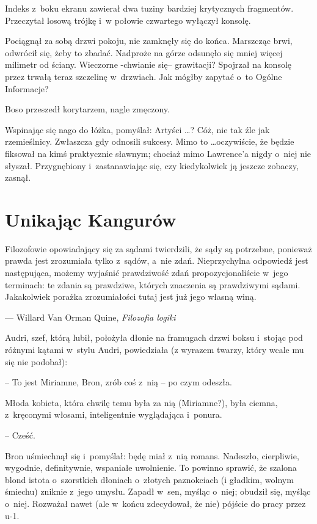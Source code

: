 \documentclass[oneside,polish,11pt,rmheadings]{mwbk}
\begin{document}
Indeks z~boku ekranu zawierał dwa tuziny bardziej krytycznych fragmentów. Przeczytał losową trójkę i~w połowie czwartego wyłączył konsolę. 

Pociągnął za sobą drzwi pokoju, nie zamknęły się do końca. Marszcząc brwi, odwrócił się, żeby to zbadać. Nadproże na górze odsunęło się mniej więcej milimetr od ściany. Wieczorne -chwianie się-- grawitacji? Spojrzał na konsolę przez trwałą teraz szczelinę w~drzwiach. Jak mógłby zapytać o~to Ogólne Informacje? 

Boso przeszedł korytarzem, nagle zmęczony. 

Wspinając się nago do łóżka, pomyślał: Artyści \ldots  ? Cóż, nie tak źle jak rzemieślnicy. Zwłaszcza gdy odnosili sukcesy. Mimo to \ldots  oczywiście, że będzie fiksował na kimś praktycznie sławnym; chociaż mimo Lawrence'a nigdy o~niej nie słyszał. Przygnębiony i~zastanawiając się, czy kiedykolwiek ją jeszcze zobaczy, zasnął. 

\chapter{Unikając Kangurów}

Filozofowie opowiadający się za sądami twierdzili, że sądy są potrzebne, ponieważ prawda jest zrozumiała tylko z~sądów, a~nie zdań. Nieprzychylna odpowiedź jest następująca, możemy wyjaśnić prawdziwość zdań propozycjonaliście w~jego terminach: te zdania są prawdziwe, których znaczenia są prawdziwymi sądami. Jakakolwiek porażka zrozumiałości tutaj jest już jego własną winą. 

\smallskip
\noindent --- Willard Van Orman Quine, \textit{Filozofia logiki} 

\bigskip

Audri, szef, którą lubił, położyła dłonie na framugach drzwi boksu i~stojąc pod różnymi kątami w~stylu Audri, powiedziała (z wyrazem twarzy, który wcale mu się nie podobał):  

-- To jest Miriamne, Bron, zrób coś z~nią -- po czym odeszła. 

Młoda kobieta, która chwilę temu była za nią (Miriamne?), była ciemna, z~kręconymi włosami, inteligentnie wyglądająca i~ponura. 

 -- Cześć. 
 
Bron uśmiechnął się i~pomyślał: będę miał z~nią romans. Nadeszło, cierpliwie, wygodnie, definitywnie, wspaniałe uwolnienie. To powinno sprawić, że szalona blond istota o~szorstkich dłoniach o~złotych paznokciach (i gładkim, wolnym śmiechu) zniknie z~jego umysłu.  Zapadł w~sen, myśląc o~niej; obudził się, myśląc o~niej. Rozważał nawet (ale w~końcu zdecydował, że nie) pójście do pracy przez u-1.  
\end{document}
